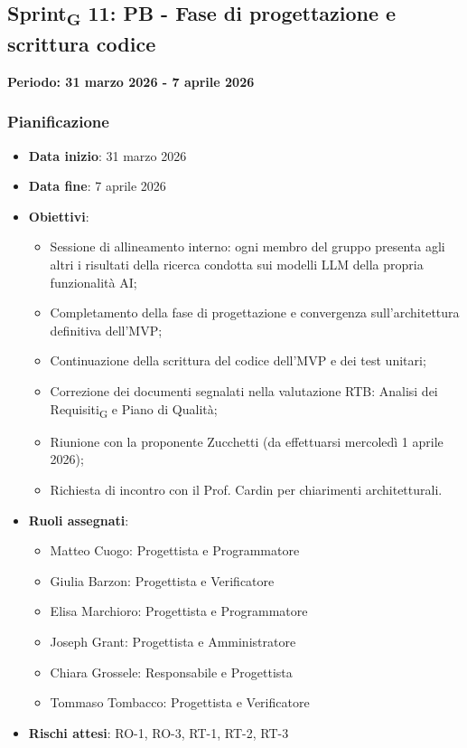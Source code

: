 \documentclass[11pt,a4paper]{article}
\newcommand{\gls}[1]{#1\textsubscript{G}}
\begin{document}
\subsection{\gls{Sprint} 11: PB - Fase di progettazione e scrittura codice}
{\textbf{Periodo: 31 marzo 2026 - 7 aprile 2026}\par}

\subsubsection{Pianificazione}
\begin{itemize}
    \item \textbf{Data inizio}: 31 marzo 2026
    \item \textbf{Data fine}: 7 aprile 2026
        \item \textbf{Obiettivi}:
    \begin{itemize}
        \item Sessione di allineamento interno: ogni membro del gruppo presenta agli altri i risultati della ricerca condotta sui modelli LLM della propria funzionalità AI;
        \item Completamento della fase di progettazione e convergenza sull'architettura definitiva dell'MVP;
        \item Continuazione della scrittura del codice dell'MVP e dei test unitari;
        \item Correzione dei documenti segnalati nella valutazione RTB: \gls{Analisi dei Requisiti} e Piano di Qualità;
        \item Riunione con la proponente Zucchetti (da effettuarsi mercoledì 1 aprile 2026);
        \item Richiesta di incontro con il Prof. Cardin per chiarimenti architetturali.
    \end{itemize}
    
    \item \textbf{Ruoli assegnati}:
    \begin{itemize}
        \item Matteo Cuogo: Progettista e Programmatore
        \item Giulia Barzon: Progettista e Verificatore
        \item Elisa Marchioro: Progettista e Programmatore
        \item Joseph Grant: Progettista e Amministratore
        \item Chiara Grossele: Responsabile e Progettista
        \item Tommaso Tombacco: Progettista e Verificatore
    \end{itemize}
    \item \textbf{Rischi attesi}: RO-1, RO-3, RT-1, RT-2, RT-3
\end{itemize}
\end{document}
